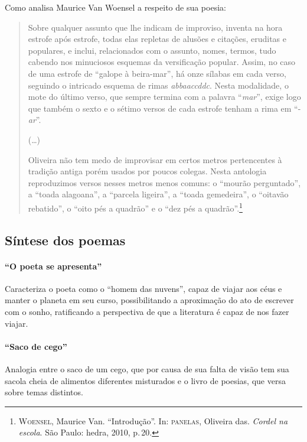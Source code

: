 Como analisa Maurice Van Woensel a respeito de sua poesia:

\begin{quote}
Sobre qualquer assunto que lhe indicam de improviso,
inventa na hora estrofe após estrofe, todas elas repletas de
alusões e citações, eruditas e populares, e inclui,
relacionados com o assunto, nomes, termos, tudo cabendo
nos minuciosos esquemas da versificação popular. Assim,
no caso de uma estrofe de ``galope à
beira-mar'', há onze sílabas em cada verso, seguindo o intricado
esquema de rimas \textit{abbaaccddc}. Nesta modalidade, o mote
do último verso, que sempre termina com a palavra
``\textit{mar}'', exige logo que também o sexto e o sétimo versos de cada
estrofe tenham a rima em ``-\textit{ar}''.

(\ldots)

Oliveira não tem medo de improvisar em certos metros
pertencentes à tradição antiga porém usados por poucos
colegas. Nesta antologia reproduzimos versos nesses metros
menos comuns: o ``mourão perguntado'', a
``toada alagoana'', a ``parcela ligeira'', a ``toada gemedeira'', o
``oitavão rebatido'', o ``oito pés a quadrão'' e o ``dez pés a
quadrão''.\footnote{\textsc{Woensel}, Maurice Van. ``Introdução''. In: \textsc{panelas}, Oliveira das. \textit{Cordel na escola}. São Paulo: hedra, 2010, p.\,20.}
\end{quote}

\subsection{Síntese dos poemas}

\paragraph{``O poeta se apresenta''}

Caracteriza o poeta como o ``homem das
nuvens'', capaz de viajar aos céus e manter o planeta
em seu curso, possibilitando a aproximação do ato de escrever com o
sonho, ratificando a perspectiva de que a literatura é capaz de nos
fazer viajar.
 
\paragraph{``Saco de cego''}

Analogia entre o saco de um cego, que por causa de sua falta de visão
tem sua sacola cheia de alimentos diferentes misturados e o livro de
poesias, que versa sobre temas distintos.

